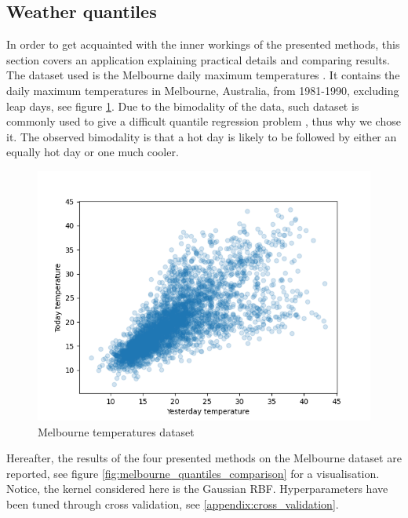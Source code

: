 \subsection{Weather quantiles}
In order to get acquainted with the inner workings of the presented methods, this section covers an application explaining practical details and comparing results.
\\
The dataset used is the Melbourne daily maximum temperatures \cite{hdrcde}. It contains the daily maximum temperatures in Melbourne, Australia, from 1981-1990, excluding leap days, see figure \ref{fig:melbourne_temperature_data}.
Due to the bimodality of the data, such dataset is commonly used to give a difficult quantile regression problem \cite{hyndman1996estimating}, thus why we chose it. The observed bimodality is that a hot day is likely to be followed by either an equally hot day or one much cooler.
\begin{figure}[!h]
    \includegraphics[width=\textwidth]{images/melbourne_temperature.png}
    \caption{Melbourne temperatures dataset}
    \label{fig:melbourne_temperature_data}
\end{figure}
Hereafter, the results of the four presented methods on the Melbourne dataset are reported, see figure \ref{fig:melbourne_quantiles_comparison} for a visualisation. Notice, the kernel considered here is the Gaussian RBF. Hyperparameters have been tuned through cross validation, see \ref{appendix:cross_validation}.

